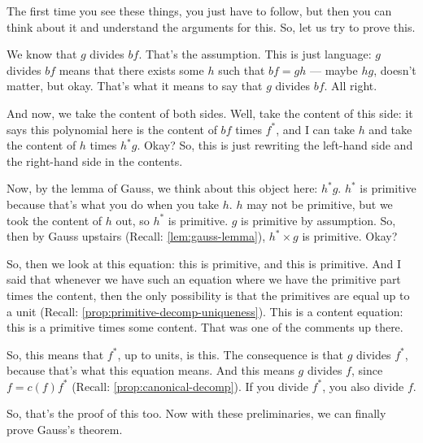 \begin{speech}[00:16:14 - 00:17:55]
The first time you see these things, you just have to follow, but then you can think about it and understand the arguments for this. So, let us try to prove this.

We know that $g$ divides $bf$. That's the assumption. This is just language: $g$ divides $bf$ means that there exists some $h$ such that $bf = gh$ --- maybe $hg$, doesn't matter, but okay.  That's what it means to say that $g$ divides $bf$. All right.

And now, we take the content of both sides. Well, take the content of this side: it says this polynomial here is the content of $bf$ times $f^*$, and I can take $h$ and take the content of $h$ times $h^* g$.  Okay? So, this is just rewriting the left-hand side and the right-hand side in the contents.

Now, by the lemma of Gauss, we think about this object here: $h^* g$. $h^*$ is primitive because that's what you do when you take $h$. $h$ may not be primitive, but we took the content of $h$ out, so $h^*$ is primitive. $g$ is primitive by assumption. So, then by Gauss upstairs (Recall: \cref{lem:gauss-lemma}), $h^* \times g$ is primitive.  Okay?
\end{speech}

\begin{speech}[00:17:55 - 00:19:24]
So, then we look at this equation: this is primitive, and this is primitive. And I said that whenever we have such an equation where we have the primitive part times the content, then the only possibility is that the primitives are equal up to a unit (Recall: \cref{prop:primitive-decomp-uniqueness}). This is a content equation: this is a primitive times some content. That was one of the comments up there.

So, this means that $f^*$, up to units, is this.  The consequence is that $g$ divides $f^*$, because that's what this equation means. And this means $g$ divides $f$, since $f = c(f) f^*$ (Recall: \cref{prop:canonical-decomp}).  If you divide $f^*$, you also divide $f$.

So, that's the proof of this too. Now with these preliminaries, we can finally prove Gauss's theorem.
\end{speech}

